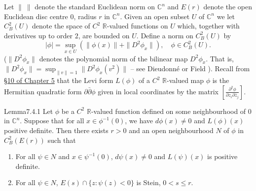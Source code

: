 Let $\|\ \|$ denote the standard Euclidean norm on $\mathbb C^n$ and $E(r)$ denote the open Euclidean disc centre $0$, radius $r$ in $\mathbb C^n$. Given an open subset $U$ of $\mathbb C^n$ we let $C_B^2(U)$ denote the space of $C^2$ $\mathbb R$-valued functions on $U$ which, together with derivatives up to order $2$, are bounded on $U$. Define a norm on $C_B^2(U)$ by
\[
|\phi|=\sup_{x\in U}(\|\phi(x)\|+\|D^2\phi_x\|),\quad\phi\in C_B^2(U).
\]
($\|D^2\phi_x\|$ denotes the polynomial norm of the bilinear map $D^2\phi_x$. That is, $\|D^2\phi_x\|=\sup_{\|v\|=1}\|D^2\phi_x(v^2)\|$ -- see Dieudonn\'e \cite{bib:II:dieudonne-j:1} or Field \cite{bib:II:field-m-j:1}). Recall from \hyperref[sec:5:10]{\S10 of Chapter 5} that the Levi form $L(\phi)$ of a $C^2$ $\mathbb R$-valued map $\phi$ is the Hermitian quadratic form $\partial\bar\partial\phi$ given in local coordinates by the matrix $[\frac{\partial^2\phi}{\partial z_i\partial\bar z_j}]$.
\begin{originaltheorem}{Lemma}{7.4.1}
Let $\phi$ be a $C^2$ $\mathbb R$-valued function defined on some neighbourhood of $0$ in $\mathbb C^n$. Suppose that for all $x\in\phi^{-1}(0)$, we have $d\phi(x)\ne0$ and $L(\phi)(x)$ positive definite. Then there exists $r>0$ and an open neighbourhood $N$ of $\phi$ in $C_B^2(E(r))$ such that
\begin{enumerate}[label=\arabic*.]
\item For all $\psi\in N$ and $x\in\psi^{-1}(0)$, $d\psi(x)\ne0$ and $L(\psi)(x)$ is positive definite.
\item For all $\psi\in N$, $E(s)\cap\{z:\psi(z)<0\}$ is Stein, $0<s\leq r$.
\end{enumerate}
\end{originaltheorem}
